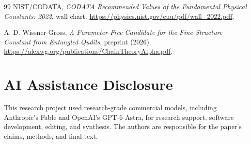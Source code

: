 \documentclass[11pt]{article}
\theoremstyle{remark}
\begin{document}
\begin{thebibliography}{99}
NIST/CODATA,
\emph{CODATA Recommended Values of the Fundamental Physical Constants: 2022},
wall chart.
\url{https://physics.nist.gov/cuu/pdf/wall_2022.pdf}.

A. D. Wissner-Gross, \emph{A Parameter-Free Candidate for the Fine-Structure
Constant from Entangled Qudits}, preprint (2026).
\url{https://alexwg.org/publications/ChainTheoryAlpha.pdf}.

\end{thebibliography}

\section*{AI Assistance Disclosure}
This research project used research-grade commercial models, including
Anthropic's Fable and OpenAI's GPT-6 Astra, for research support, software
development, editing, and synthesis. The authors are responsible for the
paper's claims, methods, and final text.
\end{document}
